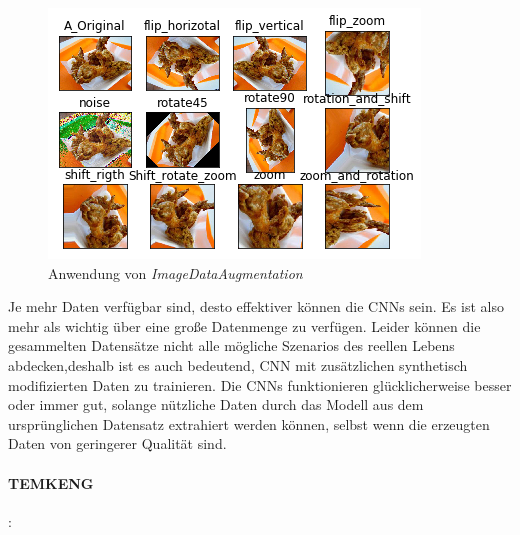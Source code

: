 \documentclass[12pt,a4paper]{scrartcl}
\numberwithin{equation}{section}
\begin{document}
 \begin{figure}[h]
 	\centering
 	\includegraphics{ImageDataAugmaentation.png}
 	\caption{Anwendung von \textit{ImageDataAugmentation} }
 	\label{fig:ImageDataAugmentation}
 \end{figure}
 
Je mehr Daten verfügbar sind, desto effektiver können die \acsp{CNN} sein. Es ist also mehr als wichtig über eine große Datenmenge zu verfügen. Leider können die gesammelten Datensätze nicht alle mögliche Szenarios des reellen Lebens abdecken,deshalb ist es auch bedeutend, \ac{CNN}  mit zusätzlichen synthetisch modifizierten Daten zu trainieren. Die \acsp{CNN} funktionieren glücklicherweise besser oder immer gut, solange nützliche Daten durch das Modell aus dem ursprünglichen Datensatz extrahiert werden können, selbst wenn die erzeugten Daten von geringerer Qualität sind.\\
 

 \paragraph{TEMKENG}:\\
\end{document}
